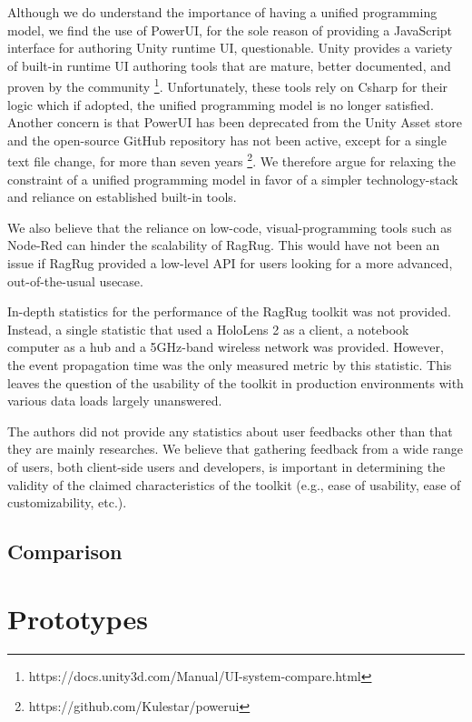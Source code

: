 \documentclass{vgtc}                          %
\begin{document}
\noindent Although we do understand the importance of having a unified programming model, we find the use of
PowerUI, for the sole reason of providing a JavaScript interface for authoring Unity runtime UI,
questionable. Unity provides a variety of built-in runtime UI authoring tools that are mature,
better documented, and proven by the community \footnote{https://docs.unity3d.com/Manual/UI-system-compare.html}.
Unfortunately, these tools rely on Csharp for their logic which if adopted, the unified programming model is
no longer satisfied. Another concern is that PowerUI has
been deprecated from the Unity Asset store and the open-source GitHub repository has not been active, except
for a single text file change, for more than seven years \footnote{https://github.com/Kulestar/powerui}. We
therefore argue for relaxing the constraint of a unified programming model in favor of a simpler 
technology-stack and reliance on established built-in tools.

\smallskip

\noindent We also believe that the reliance on low-code, visual-programming tools such as Node-Red can hinder
the scalability of RagRug. This would have not been an issue if RagRug provided a low-level API for users
looking for a more advanced, out-of-the-usual usecase.

\medskip

\noindent In-depth statistics for the performance of the RagRug toolkit was not provided. Instead, a single
statistic that used a HoloLens 2 as a client, a notebook computer as a hub and a 5GHz-band wireless network
was provided. However, the event propagation time was the only measured metric by this statistic.
This leaves the question of the usability of the toolkit in production environments with various data loads
largely unanswered.

\medskip

\noindent The authors did not provide any statistics about user feedbacks other than that they are mainly
researches. We believe that gathering feedback from a wide range of users, both client-side users and
developers, is important in determining the validity of the claimed characteristics of the toolkit (e.g.,
ease of usability, ease of customizability, etc.).

\subsection{Comparison}

\section{Prototypes}
\end{document}
